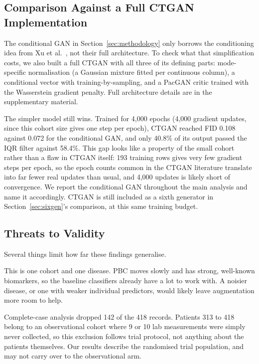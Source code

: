 \documentclass[journal]{IEEEtran}
\begin{document}
\subsection{Comparison Against a Full CTGAN Implementation}
\label{sec:ctgancomp}

The conditional GAN in Section~\ref{sec:methodology} only borrows the conditioning idea from Xu et al.\ \cite{xu2019}, not their full architecture. To check what that simplification costs, we also built a full CTGAN with all three of its defining parts: mode-specific normalisation (a Gaussian mixture fitted per continuous column), a conditional vector with training-by-sampling, and a PacGAN critic trained with the Wasserstein gradient penalty. Full architecture details are in the supplementary material.

The simpler model still wins. Trained for 4,000 epochs (4,000 gradient updates, since this cohort size gives one step per epoch), CTGAN reached FID 0.108 against 0.072 for the conditional GAN, and only 40.8\% of its output passed the IQR filter against 58.4\%. This gap looks like a property of the small cohort rather than a flaw in CTGAN itself: 193 training rows gives very few gradient steps per epoch, so the epoch counts common in the CTGAN literature translate into far fewer real updates than usual, and 4,000 updates is likely short of convergence. We report the conditional GAN throughout the main analysis and name it accordingly. CTGAN is still included as a sixth generator in Section~\ref{sec:sixgen}'s comparison, at this same training budget.

\subsection{Threats to Validity}

Several things limit how far these findings generalise.

This is one cohort and one disease. PBC moves slowly and has strong, well-known biomarkers, so the baseline classifiers already have a lot to work with. A noisier disease, or one with weaker individual predictors, would likely leave augmentation more room to help.

Complete-case analysis dropped 142 of the 418 records. Patients 313 to 418 belong to an observational cohort where 9 or 10 lab measurements were simply never collected, so this exclusion follows trial protocol, not anything about the patients themselves. Our results describe the randomised trial population, and may not carry over to the observational arm.
\end{document}
